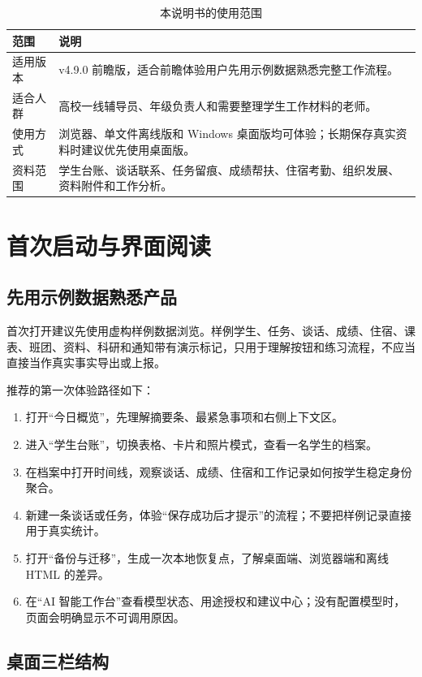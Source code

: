 \documentclass[UTF8,zihao=-4,oneside]{ctexrep}
\begin{document}
\begin{table}[H]
\centering
\caption{本说明书的使用范围}
\begin{tabularx}{\textwidth}{B{30mm} Y}
\toprule
范围 & 说明 \\
\midrule
适用版本 & v4.9.0 前瞻版，适合前瞻体验用户先用示例数据熟悉完整工作流程。 \\
适合人群 & 高校一线辅导员、年级负责人和需要整理学生工作材料的老师。 \\
使用方式 & 浏览器、单文件离线版和 Windows 桌面版均可体验；长期保存真实资料时建议优先使用桌面版。 \\
资料范围 & 学生台账、谈话联系、任务留痕、成绩帮扶、住宿考勤、组织发展、资料附件和工作分析。 \\
\bottomrule
\end{tabularx}
\end{table}

\chapter{首次启动与界面阅读}

\section{先用示例数据熟悉产品}

首次打开建议先使用虚构样例数据浏览。样例学生、任务、谈话、成绩、住宿、课表、班团、资料、科研和通知带有演示标记，只用于理解按钮和练习流程，不应当直接当作真实事实导出或上报。

推荐的第一次体验路径如下：

\begin{enumerate}
  \item 打开“今日概览”，先理解摘要条、最紧急事项和右侧上下文区。
  \item 进入“学生台账”，切换表格、卡片和照片模式，查看一名学生的档案。
  \item 在档案中打开时间线，观察谈话、成绩、住宿和工作记录如何按学生稳定身份聚合。
  \item 新建一条谈话或任务，体验“保存成功后才提示”的流程；不要把样例记录直接用于真实统计。
  \item 打开“备份与迁移”，生成一次本地恢复点，了解桌面端、浏览器端和离线 HTML 的差异。
  \item 在“AI 智能工作台”查看模型状态、用途授权和建议中心；没有配置模型时，页面会明确显示不可调用原因。
\end{enumerate}

\section{桌面三栏结构}
\end{document}
